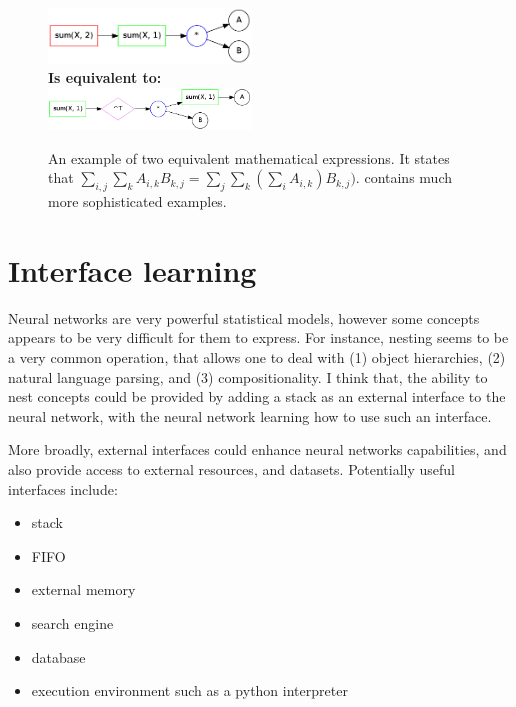 \documentclass{article}
\begin{document}
\begin{figure}
  \centering
  \includegraphics[width=0.48\textwidth]{imgs/example1_brute.png}\\
  {\bf Is equivalent to:}\\
  \includegraphics[width=0.48\textwidth]{imgs/example1_opt.png}\\
  \caption{An example of two equivalent mathematical expressions. It states that
  $\sum_{i,j} \sum_k A_{i, k}B_{k, j} = \sum_{j} \sum_k (\sum_i A_{i,
    k})B_{k, j})$. \cite{zaremba2014learning} contains much more sophisticated examples.}
  \label{fig:ident}
\end{figure}


\section{Interface learning}
\label{sec:interface}
Neural networks are very powerful statistical models, however some
concepts appears to be very difficult for them to express.  For instance,
nesting seems to be a very common operation, that allows one to deal
with (1) object hierarchies, (2) natural language parsing, and (3)
compositionality. I think that, the ability to nest concepts could be provided by
adding a stack as an external interface to the neural network, with
the neural network learning how to use such an interface.

More broadly, external interfaces could enhance neural networks capabilities, and also provide
access to external resources, and datasets. Potentially useful
interfaces include:
\begin{itemize}
  \item stack
  \item FIFO
  \item external memory \cite{weston2014memory, graves2014neural}
  \item search engine
  \item database
  \item execution environment such as a python interpreter
\end{itemize}
\end{document}
